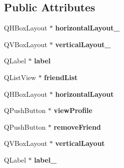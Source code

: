 \subsection*{Public Attributes}
\begin{DoxyCompactItemize}
\item 
Q\+H\+Box\+Layout $\ast$ {\bfseries horizontal\+Layout\+\_}\hypertarget{classUi__FriendsGUI_a534a67e6db179e8ccb61c5efca9e4d63}{}\label{classUi__FriendsGUI_a534a67e6db179e8ccb61c5efca9e4d63}

\item 
Q\+V\+Box\+Layout $\ast$ {\bfseries vertical\+Layout\+\_}\hypertarget{classUi__FriendsGUI_a53e1aadb7c4f4fffb3837d0ea69861b4}{}\label{classUi__FriendsGUI_a53e1aadb7c4f4fffb3837d0ea69861b4}

\item 
Q\+Label $\ast$ {\bfseries label}\hypertarget{classUi__FriendsGUI_ad71a70594fa7249aa515caef61fe56c7}{}\label{classUi__FriendsGUI_ad71a70594fa7249aa515caef61fe56c7}

\item 
Q\+List\+View $\ast$ {\bfseries friend\+List}\hypertarget{classUi__FriendsGUI_a702535aa533c6cf1921de7a56cfd0acf}{}\label{classUi__FriendsGUI_a702535aa533c6cf1921de7a56cfd0acf}

\item 
Q\+H\+Box\+Layout $\ast$ {\bfseries horizontal\+Layout}\hypertarget{classUi__FriendsGUI_ab03e52b103acd258f6234c15c24a690e}{}\label{classUi__FriendsGUI_ab03e52b103acd258f6234c15c24a690e}

\item 
Q\+Push\+Button $\ast$ {\bfseries view\+Profile}\hypertarget{classUi__FriendsGUI_af0e64fa0f3b0dce3c04da9165fa1320b}{}\label{classUi__FriendsGUI_af0e64fa0f3b0dce3c04da9165fa1320b}

\item 
Q\+Push\+Button $\ast$ {\bfseries remove\+Friend}\hypertarget{classUi__FriendsGUI_aa02228daa7108edf93aad5739ed3796b}{}\label{classUi__FriendsGUI_aa02228daa7108edf93aad5739ed3796b}

\item 
Q\+V\+Box\+Layout $\ast$ {\bfseries vertical\+Layout}\hypertarget{classUi__FriendsGUI_aa5fd145f406daa99c9678f227241c354}{}\label{classUi__FriendsGUI_aa5fd145f406daa99c9678f227241c354}

\item 
Q\+Label $\ast$ {\bfseries label\+\_}\hypertarget{classUi__FriendsGUI_a0b2f31bf4c5b84a3c0580091f88f1a42}{}\label{classUi__FriendsGUI_a0b2f31bf4c5b84a3c0580091f88f1a42}


\end{DoxyCompactItemize}
